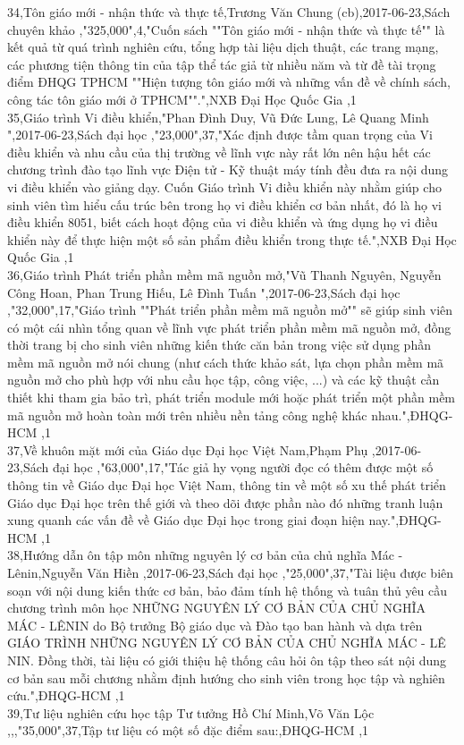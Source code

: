 \documentclass[a4paper]{article}
\begin{document}
34,Tôn giáo mới - nhận thức và thực tế,Trương Văn Chung (cb),2017-06-23,Sách chuyên khảo ,"325,000",4,"Cuốn sách ""Tôn giáo mới - nhận thức và thực tế"" là kết quả từ quá trình nghiên cứu, tổng hợp tài liệu dịch thuật, các trang mạng, các phương tiện thông tin của tập thể tác giả từ nhiều năm và từ đề tài trọng điểm ĐHQG TPHCM ""Hiện tượng tôn giáo mới và những vấn đề về chính sách, công tác tôn giáo mới ở TPHCM"".",NXB Đại Học Quốc Gia ,1\\
35,Giáo trình Vi điều khiển,"Phan Đình Duy, Vũ Đức Lung, Lê Quang Minh ",2017-06-23,Sách đại học ,"23,000",37,"Xác định được tầm quan trọng của Vi điều khiển và nhu cầu của thị trường về lĩnh vực này rất lớn nên hậu hết các chương trình đào tạo lĩnh vực Điện tử - Kỹ thuật máy tính đều đưa ra nội dung vi điều khiển vào giảng dạy. Cuốn Giáo trình Vi điều khiển này nhằm giúp cho sinh viên tìm hiểu cấu trúc bên trong họ vi điều khiển cơ bản nhất, đó là họ vi điều khiển 8051, biết cách hoạt động của vi điều khiển và ứng dụng họ vi điều khiển này để thực hiện một số sản phẩm điều khiển trong thực tế.",NXB Đại Học Quốc Gia ,1\\
36,Giáo trình Phát triển phần mềm mã nguồn mở,"Vũ Thanh Nguyên, Nguyễn Công Hoan, Phan Trung Hiếu, Lê Đình Tuấn ",2017-06-23,Sách đại học ,"32,000",17,"Giáo trình ""Phát triển phần mềm mã nguồn mở"" sẽ giúp sinh viên có một cái nhìn tổng quan về lĩnh vực phát triển phần mềm mã nguồn mở, đồng thời trang bị cho sinh viên những kiến thức căn bản trong việc sử dụng phần mềm mã nguồn mở nói chung (như cách thức khảo sát, lựa chọn phần mềm mã nguồn mở cho phù hợp với nhu cầu học tập, công việc, ...) và các kỹ thuật cần thiết khi tham gia bảo trì, phát triển module mới hoặc phát triển một phần mềm mã nguồn mở hoàn toàn mới trên nhiều nền tảng công nghệ khác nhau.",ĐHQG-HCM ,1\\
37,Về khuôn mặt mới của Giáo dục Đại học Việt Nam,Phạm Phụ ,2017-06-23,Sách đại học ,"63,000",17,"Tác giả hy vọng người đọc có thêm được một số thông tin về Giáo dục Đại học Việt Nam, thông tin về một số xu thế phát triển Giáo dục Đại học trên thế giới và theo dõi được phần nào đó những tranh luận xung quanh các vấn đề về Giáo dục Đại học trong giai đoạn hiện nay.",ĐHQG-HCM ,1\\
38,Hướng dẫn ôn tập môn những nguyên lý cơ bản của chủ nghĩa Mác - Lênin,Nguyễn Văn Hiền ,2017-06-23,Sách đại học ,"25,000",37,"Tài liệu được biên soạn với nội dung kiến thức cơ bản, bảo đảm tính hệ thống và tuân thủ yêu cầu chương trình môn học NHỮNG NGUYÊN LÝ CƠ BẢN CỦA CHỦ NGHĨA MÁC - LÊNIN do Bộ trưởng Bộ giáo dục và Đào tạo ban hành và dựa trên GIÁO TRÌNH NHỮNG NGUYÊN LÝ CƠ BẢN CỦA CHỦ NGHĨA MÁC - LÊ NIN. Đồng thời, tài liệu có giới thiệu hệ thống câu hỏi ôn tập theo sát nội dung cơ bản sau mỗi chương nhằm định hướng cho sinh viên trong học tập và nghiên cứu.",ĐHQG-HCM ,1\\
39,Tư liệu nghiên cứu học tập Tư tưởng Hồ Chí Minh,Võ Văn Lộc ,,,"35,000",37,Tập tư liệu có một số đặc điểm sau:,ĐHQG-HCM ,1\\
\end{document}
